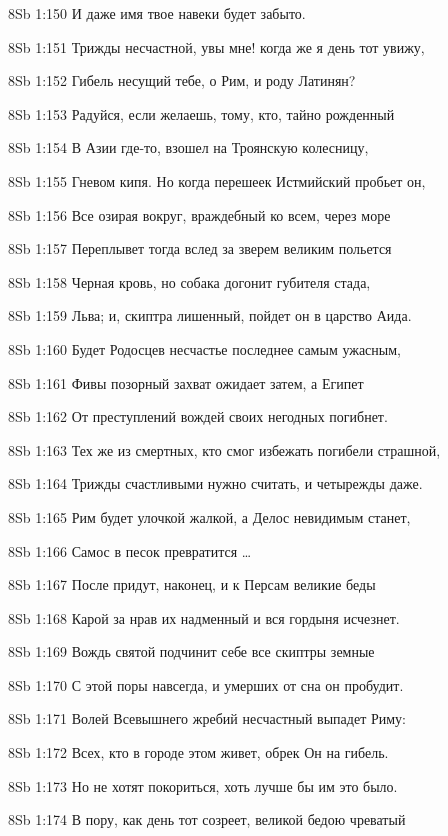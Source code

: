 \vs 8Sb 1:150 И даже имя твое навеки будет забыто.

\vs 8Sb 1:151 Трижды несчастной, увы мне! когда же я день тот увижу, 

\vs 8Sb 1:152 Гибель несущий тебе, о Рим, и роду Латинян? 

\vs 8Sb 1:153 Радуйся, если желаешь, тому, кто, тайно рожденный 

\vs 8Sb 1:154 В Азии где-то, взошел на Троянскую колесницу, 

\vs 8Sb 1:155 Гневом кипя. Но когда перешеек Истмийский пробьет он, 

\vs 8Sb 1:156 Все озирая вокруг, враждебный ко всем, через море 

\vs 8Sb 1:157 Переплывет  тогда вслед за зверем великим польется 

\vs 8Sb 1:158 Черная кровь, но собака догонит губителя стада, 

\vs 8Sb 1:159 Льва; и, скиптра лишенный, пойдет он в царство Аида.

\vs 8Sb 1:160 Будет Родосцев несчастье последнее самым ужасным, 

\vs 8Sb 1:161 Фивы позорный захват ожидает затем, а Египет 

\vs 8Sb 1:162 От преступлений вождей своих негодных погибнет. 

\vs 8Sb 1:163 Тех же из смертных, кто смог избежать погибели страшной, 

\vs 8Sb 1:164 Трижды счастливыми нужно считать, и четырежды даже.

\vs 8Sb 1:165 Рим будет улочкой жалкой, а Делос невидимым станет, 

\vs 8Sb 1:166 Самос в песок превратится \ldots

\vs 8Sb 1:167 После придут, наконец, и к Персам великие беды 

\vs 8Sb 1:168 Карой за нрав их надменный  и вся гордыня исчезнет.

\vs 8Sb 1:169 Вождь святой подчинит себе все скиптры земные 

\vs 8Sb 1:170 С этой поры навсегда, и умерших от сна он пробудит.

\vs 8Sb 1:171 Волей Всевышнего жребий несчастный выпадет Риму:

\vs 8Sb 1:172 Всех, кто в городе этом живет, обрек Он на гибель.

\vs 8Sb 1:173 Но не хотят покориться, хоть лучше бы им это было.

\vs 8Sb 1:174 В пору, как день тот созреет, великой бедою чреватый  


